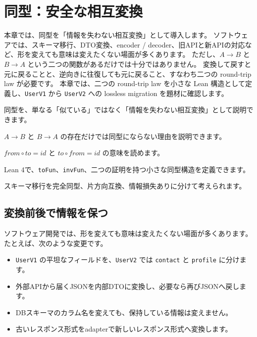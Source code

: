 \chapter{同型：安全な相互変換}
\label{chap:ch12-isomorphism}

\begin{chapterabstract}
本章では、同型を「情報を失わない相互変換」として導入します。
ソフトウェアでは、スキーマ移行、DTO変換、encoder / decoder、旧APIと新APIの対応など、形を変えても意味は変えたくない場面が多くあります。
ただし、$A \to B$ と $B \to A$ という二つの関数があるだけでは十分ではありません。
変換して戻すと元に戻ることと、逆向きに往復しても元に戻ること、すなわち二つの round-trip law が必要です。
本章では、二つの round-trip law を小さな Lean 構造として定義し、\texttt{UserV1} から \texttt{UserV2} への lossless migration を題材に確認します。
\end{chapterabstract}

\begin{learninggoals}
\item 同型を、単なる「似ている」ではなく「情報を失わない相互変換」として説明できます。
\item $A \to B$ と $B \to A$ の存在だけでは同型にならない理由を説明できます。
\item $\mathit{from} \circ \mathit{to} = \mathit{id}$ と $\mathit{to} \circ \mathit{from} = \mathit{id}$ の意味を読めます。
\item Lean 4で、\texttt{toFun}、\texttt{invFun}、二つの証明を持つ小さな同型構造を定義できます。
\item スキーマ移行を完全同型、片方向互換、情報損失ありに分けて考えられます。
\end{learninggoals}

\section{変換前後で情報を保つ}
\label{sec:ch12-why}

ソフトウェア開発では、形を変えても意味は変えたくない場面が多くあります。
たとえば、次のような変更です。

\begin{itemize}
\item \texttt{UserV1} の平坦なフィールドを、\texttt{UserV2} では \texttt{contact} と \texttt{profile} に分けます。
\item 外部APIから届くJSONを内部DTOに変換し、必要なら再びJSONへ戻します。
\item DBスキーマのカラム名を変えても、保持している情報は変えません。
\item 古いレスポンス形式をadapterで新しいレスポンス形式へ変換します。
\end{itemize}

